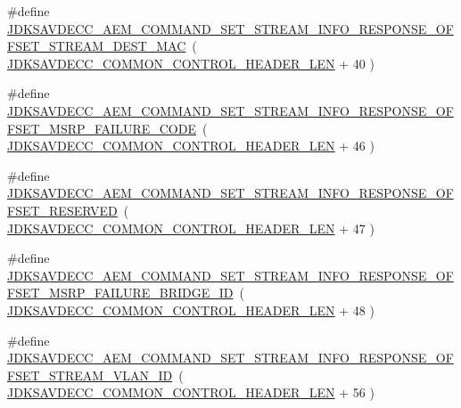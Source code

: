 \begin{DoxyCompactItemize}
\item 
\#define \hyperlink{group__command__set__stream__info__response_gae3c3cca41b4c6656ececc8a1b9f7d07f}{J\+D\+K\+S\+A\+V\+D\+E\+C\+C\+\_\+\+A\+E\+M\+\_\+\+C\+O\+M\+M\+A\+N\+D\+\_\+\+S\+E\+T\+\_\+\+S\+T\+R\+E\+A\+M\+\_\+\+I\+N\+F\+O\+\_\+\+R\+E\+S\+P\+O\+N\+S\+E\+\_\+\+O\+F\+F\+S\+E\+T\+\_\+\+S\+T\+R\+E\+A\+M\+\_\+\+D\+E\+S\+T\+\_\+\+M\+AC}~( \hyperlink{group__jdksavdecc__avtp__common__control__header_gaae84052886fb1bb42f3bc5f85b741dff}{J\+D\+K\+S\+A\+V\+D\+E\+C\+C\+\_\+\+C\+O\+M\+M\+O\+N\+\_\+\+C\+O\+N\+T\+R\+O\+L\+\_\+\+H\+E\+A\+D\+E\+R\+\_\+\+L\+EN} + 40 )
\item 
\#define \hyperlink{group__command__set__stream__info__response_gac427bd80582bd0751928ddd6dab02d19}{J\+D\+K\+S\+A\+V\+D\+E\+C\+C\+\_\+\+A\+E\+M\+\_\+\+C\+O\+M\+M\+A\+N\+D\+\_\+\+S\+E\+T\+\_\+\+S\+T\+R\+E\+A\+M\+\_\+\+I\+N\+F\+O\+\_\+\+R\+E\+S\+P\+O\+N\+S\+E\+\_\+\+O\+F\+F\+S\+E\+T\+\_\+\+M\+S\+R\+P\+\_\+\+F\+A\+I\+L\+U\+R\+E\+\_\+\+C\+O\+DE}~( \hyperlink{group__jdksavdecc__avtp__common__control__header_gaae84052886fb1bb42f3bc5f85b741dff}{J\+D\+K\+S\+A\+V\+D\+E\+C\+C\+\_\+\+C\+O\+M\+M\+O\+N\+\_\+\+C\+O\+N\+T\+R\+O\+L\+\_\+\+H\+E\+A\+D\+E\+R\+\_\+\+L\+EN} + 46 )
\item 
\#define \hyperlink{group__command__set__stream__info__response_ga34c6867e5aa4bb24fb93d2df8c762911}{J\+D\+K\+S\+A\+V\+D\+E\+C\+C\+\_\+\+A\+E\+M\+\_\+\+C\+O\+M\+M\+A\+N\+D\+\_\+\+S\+E\+T\+\_\+\+S\+T\+R\+E\+A\+M\+\_\+\+I\+N\+F\+O\+\_\+\+R\+E\+S\+P\+O\+N\+S\+E\+\_\+\+O\+F\+F\+S\+E\+T\+\_\+\+R\+E\+S\+E\+R\+V\+ED}~( \hyperlink{group__jdksavdecc__avtp__common__control__header_gaae84052886fb1bb42f3bc5f85b741dff}{J\+D\+K\+S\+A\+V\+D\+E\+C\+C\+\_\+\+C\+O\+M\+M\+O\+N\+\_\+\+C\+O\+N\+T\+R\+O\+L\+\_\+\+H\+E\+A\+D\+E\+R\+\_\+\+L\+EN} + 47 )
\item 
\#define \hyperlink{group__command__set__stream__info__response_ga346455c481a0fda0d000c38eb9242e51}{J\+D\+K\+S\+A\+V\+D\+E\+C\+C\+\_\+\+A\+E\+M\+\_\+\+C\+O\+M\+M\+A\+N\+D\+\_\+\+S\+E\+T\+\_\+\+S\+T\+R\+E\+A\+M\+\_\+\+I\+N\+F\+O\+\_\+\+R\+E\+S\+P\+O\+N\+S\+E\+\_\+\+O\+F\+F\+S\+E\+T\+\_\+\+M\+S\+R\+P\+\_\+\+F\+A\+I\+L\+U\+R\+E\+\_\+\+B\+R\+I\+D\+G\+E\+\_\+\+ID}~( \hyperlink{group__jdksavdecc__avtp__common__control__header_gaae84052886fb1bb42f3bc5f85b741dff}{J\+D\+K\+S\+A\+V\+D\+E\+C\+C\+\_\+\+C\+O\+M\+M\+O\+N\+\_\+\+C\+O\+N\+T\+R\+O\+L\+\_\+\+H\+E\+A\+D\+E\+R\+\_\+\+L\+EN} + 48 )
\item 
\#define \hyperlink{group__command__set__stream__info__response_ga021e190f4bd1f2a2d0b57598158f60ff}{J\+D\+K\+S\+A\+V\+D\+E\+C\+C\+\_\+\+A\+E\+M\+\_\+\+C\+O\+M\+M\+A\+N\+D\+\_\+\+S\+E\+T\+\_\+\+S\+T\+R\+E\+A\+M\+\_\+\+I\+N\+F\+O\+\_\+\+R\+E\+S\+P\+O\+N\+S\+E\+\_\+\+O\+F\+F\+S\+E\+T\+\_\+\+S\+T\+R\+E\+A\+M\+\_\+\+V\+L\+A\+N\+\_\+\+ID}~( \hyperlink{group__jdksavdecc__avtp__common__control__header_gaae84052886fb1bb42f3bc5f85b741dff}{J\+D\+K\+S\+A\+V\+D\+E\+C\+C\+\_\+\+C\+O\+M\+M\+O\+N\+\_\+\+C\+O\+N\+T\+R\+O\+L\+\_\+\+H\+E\+A\+D\+E\+R\+\_\+\+L\+EN} + 56 )

\end{DoxyCompactItemize}
